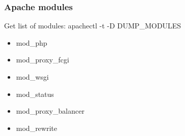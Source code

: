 \begin{frame}[fragile]
        \frametitle{Apache modules}
Get list of modules:
	apachectl -t -D DUMP\_MODULES
\begin{itemize}
    \item mod\_php
    \item mod\_proxy\_fcgi 
    \item mod\_wsgi
    \item mod\_status 
    \item mod\_proxy\_balancer
    \item mod\_rewrite
\end{itemize}
        
\end{frame}

